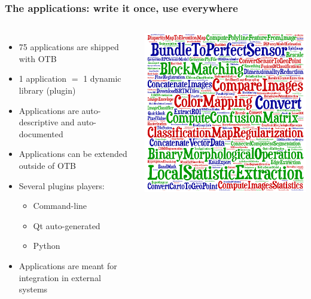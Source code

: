 \documentclass[8pt]{beamer}
\begin{document}
\begin{frame}
\frametitle{The applications: write it once, use everywhere}
\begin{columns}
\begin{itemize}
\item 75 applications are shipped with OTB
\item 1 application $=$ 1 dynamic library (plugin)
\item Applications are auto-descriptive and auto-documented
\item Applications can be extended outside of OTB
\item Several plugins players:
\begin{itemize}
  \item Command-line
  \item Qt auto-generated
  \item Python
\end{itemize}
\item Applications are meant for integration in external systems
\end{itemize}
\includegraphics[width=\textwidth]{images/cloud_applications.png}
\end{columns}
\end{frame}
\end{document}
